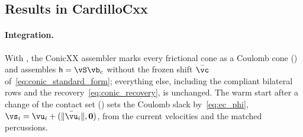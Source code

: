 \subsection{Results in CardilloCxx}\label{sec:ec_results}
%
\paragraph{Integration.} With , the ConicXX assembler marks every frictional cone as a Coulomb cone () and assembles $\mathsf{h} = \vS\vb_c$ without the frozen shift $\bar{\vc}$ of~\eqref{eq:conic_standard_form}; everything else, including the compliant bilateral rows and the recovery~\eqref{eq:conic_recovery}, is unchanged. The warm start after a change of the contact set () sets the Coulomb slack by~\eqref{eq:ec_phi}, $\vs_i = \vu_i + (\|\bar{\vu}_i\|, \mathbf{0})$, from the current velocities and the matched percussions.
%
